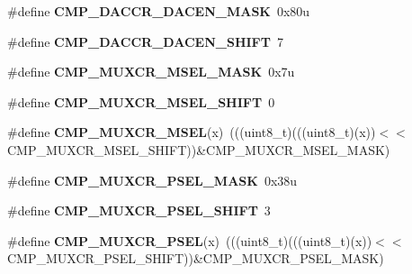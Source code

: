 \begin{DoxyCompactItemize}
\item 
\#define {\bfseries C\+M\+P\+\_\+\+D\+A\+C\+C\+R\+\_\+\+D\+A\+C\+E\+N\+\_\+\+M\+A\+SK}~0x80u\hypertarget{group__CMP__Register__Masks_gacfd8aec2de81865d8f5fc0f06d17ba08}{}\label{group__CMP__Register__Masks_gacfd8aec2de81865d8f5fc0f06d17ba08}

\item 
\#define {\bfseries C\+M\+P\+\_\+\+D\+A\+C\+C\+R\+\_\+\+D\+A\+C\+E\+N\+\_\+\+S\+H\+I\+FT}~7\hypertarget{group__CMP__Register__Masks_ga85aa1686a0d5a7de2375bfab7167bb93}{}\label{group__CMP__Register__Masks_ga85aa1686a0d5a7de2375bfab7167bb93}

\item 
\#define {\bfseries C\+M\+P\+\_\+\+M\+U\+X\+C\+R\+\_\+\+M\+S\+E\+L\+\_\+\+M\+A\+SK}~0x7u\hypertarget{group__CMP__Register__Masks_ga6ff83366097d3be5ae93234b68684cf5}{}\label{group__CMP__Register__Masks_ga6ff83366097d3be5ae93234b68684cf5}

\item 
\#define {\bfseries C\+M\+P\+\_\+\+M\+U\+X\+C\+R\+\_\+\+M\+S\+E\+L\+\_\+\+S\+H\+I\+FT}~0\hypertarget{group__CMP__Register__Masks_gad74d8206afe9b7ad009b0a7ac2bbf1cf}{}\label{group__CMP__Register__Masks_gad74d8206afe9b7ad009b0a7ac2bbf1cf}

\item 
\#define {\bfseries C\+M\+P\+\_\+\+M\+U\+X\+C\+R\+\_\+\+M\+S\+EL}(x)~(((uint8\+\_\+t)(((uint8\+\_\+t)(x))$<$$<$C\+M\+P\+\_\+\+M\+U\+X\+C\+R\+\_\+\+M\+S\+E\+L\+\_\+\+S\+H\+I\+FT))\&C\+M\+P\+\_\+\+M\+U\+X\+C\+R\+\_\+\+M\+S\+E\+L\+\_\+\+M\+A\+SK)\hypertarget{group__CMP__Register__Masks_ga31028e9db6d77502d4561380ce1b12fe}{}\label{group__CMP__Register__Masks_ga31028e9db6d77502d4561380ce1b12fe}

\item 
\#define {\bfseries C\+M\+P\+\_\+\+M\+U\+X\+C\+R\+\_\+\+P\+S\+E\+L\+\_\+\+M\+A\+SK}~0x38u\hypertarget{group__CMP__Register__Masks_gaba9739da107b2a2b908af338d14df160}{}\label{group__CMP__Register__Masks_gaba9739da107b2a2b908af338d14df160}

\item 
\#define {\bfseries C\+M\+P\+\_\+\+M\+U\+X\+C\+R\+\_\+\+P\+S\+E\+L\+\_\+\+S\+H\+I\+FT}~3\hypertarget{group__CMP__Register__Masks_gab686629f56ced4b88c699f0f610dece5}{}\label{group__CMP__Register__Masks_gab686629f56ced4b88c699f0f610dece5}

\item 
\#define {\bfseries C\+M\+P\+\_\+\+M\+U\+X\+C\+R\+\_\+\+P\+S\+EL}(x)~(((uint8\+\_\+t)(((uint8\+\_\+t)(x))$<$$<$C\+M\+P\+\_\+\+M\+U\+X\+C\+R\+\_\+\+P\+S\+E\+L\+\_\+\+S\+H\+I\+FT))\&C\+M\+P\+\_\+\+M\+U\+X\+C\+R\+\_\+\+P\+S\+E\+L\+\_\+\+M\+A\+SK)\hypertarget{group__CMP__Register__Masks_ga23ea598b890c708e1748b52475f92f50}{}\label{group__CMP__Register__Masks_ga23ea598b890c708e1748b52475f92f50}


\end{DoxyCompactItemize}
